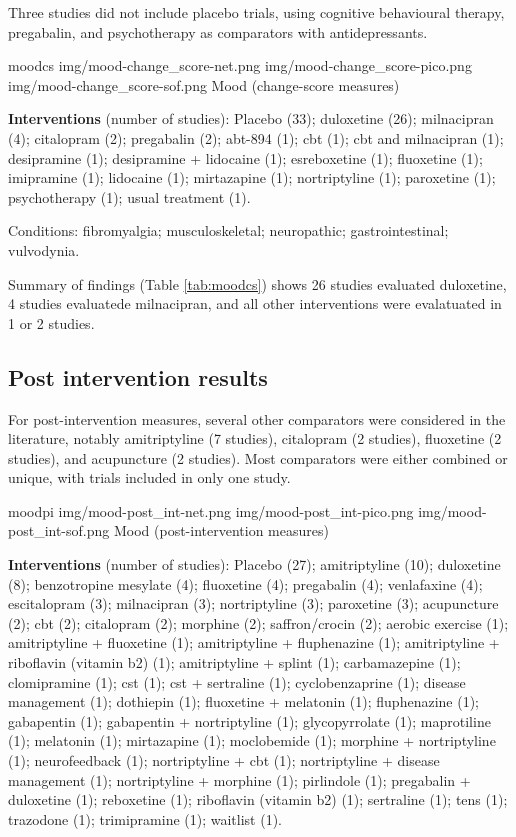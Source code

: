 \documentclass{report}\usepackage[]{graphicx}\usepackage[]{color}
\begin{document}
Three studies did not include placebo trials, using cognitive behavioural therapy, pregabalin, and psychotherapy as comparators with antidepressants.

\soffignew
{moodcs}
{img/mood-change_score-net.png}
{img/mood-change_score-pico.png}
{img/mood-change_score-sof.png}
{Mood (change-score measures)}


\textbf{Interventions} (number of studies): Placebo (33); duloxetine (26); milnacipran (4); citalopram (2); pregabalin (2); abt-894 (1); cbt (1); cbt and milnacipran (1); desipramine (1); desipramine + lidocaine (1); esreboxetine (1); fluoxetine (1); imipramine (1); lidocaine (1); mirtazapine (1); nortriptyline (1); paroxetine (1); psychotherapy (1); usual treatment (1).

Conditions: fibromyalgia; musculoskeletal; neuropathic; gastrointestinal; vulvodynia.

Summary of findings (Table \ref{tab:moodcs}) shows 26 studies evaluated duloxetine, 4 studies evaluatede milnacipran, and all other interventions were evalatuated in 1 or 2 studies.



\subsection{Post intervention results}

For post-intervention measures, several other comparators were considered in the literature, notably amitriptyline (7 studies), citalopram (2 studies), fluoxetine (2 studies), and acupuncture (2 studies). Most comparators were either combined or unique, with trials included in only one study.

\soffignew
{moodpi}
{img/mood-post_int-net.png}
{img/mood-post_int-pico.png}
{img/mood-post_int-sof.png}
{Mood (post-intervention measures)}



\textbf{Interventions} (number of studies): Placebo (27); amitriptyline (10); duloxetine (8); benzotropine mesylate (4); fluoxetine (4); pregabalin (4); venlafaxine (4); escitalopram (3); milnacipran (3); nortriptyline (3); paroxetine (3); acupuncture (2); cbt (2); citalopram (2); morphine (2); saffron/crocin (2); aerobic exercise (1); amitriptyline + fluoxetine (1); amitriptyline + fluphenazine (1); amitriptyline + riboflavin (vitamin b2) (1); amitriptyline + splint (1); carbamazepine (1); clomipramine (1); cst (1); cst + sertraline (1); cyclobenzaprine (1); disease management (1); dothiepin (1); fluoxetine + melatonin (1); fluphenazine (1); gabapentin (1); gabapentin + nortriptyline (1); glycopyrrolate (1); maprotiline (1); melatonin (1); mirtazapine (1); moclobemide (1); morphine + nortriptyline (1); neurofeedback (1); nortriptyline + cbt (1); nortriptyline + disease management (1); nortriptyline + morphine (1); pirlindole (1); pregabalin + duloxetine (1); reboxetine (1); riboflavin (vitamin b2) (1); sertraline (1); tens (1); trazodone (1); trimipramine (1); waitlist (1).
\end{document}
